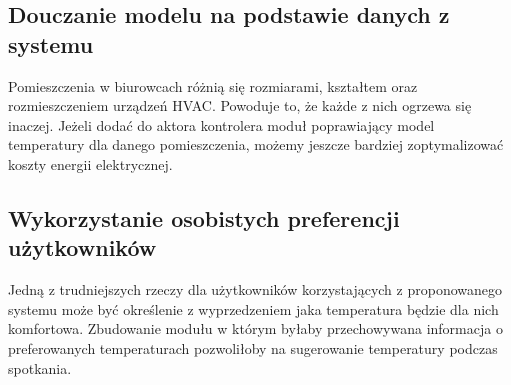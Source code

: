 \subsection*{Douczanie modelu na podstawie danych z systemu}
Pomieszczenia w biurowcach różnią się rozmiarami, kształtem oraz rozmieszczeniem urządzeń HVAC. Powoduje to, że każde z nich ogrzewa się inaczej. Jeżeli dodać do aktora kontrolera moduł poprawiający model temperatury dla danego pomieszczenia, możemy jeszcze bardziej zoptymalizować koszty energii elektrycznej.

\subsection*{Wykorzystanie osobistych preferencji użytkowników}
Jedną z trudniejszych rzeczy dla użytkowników korzystających z proponowanego systemu może być określenie z wyprzedzeniem jaka temperatura będzie dla nich komfortowa.
Zbudowanie modułu w którym byłaby przechowywana informacja o preferowanych temperaturach pozwoliłoby na sugerowanie temperatury podczas spotkania. 